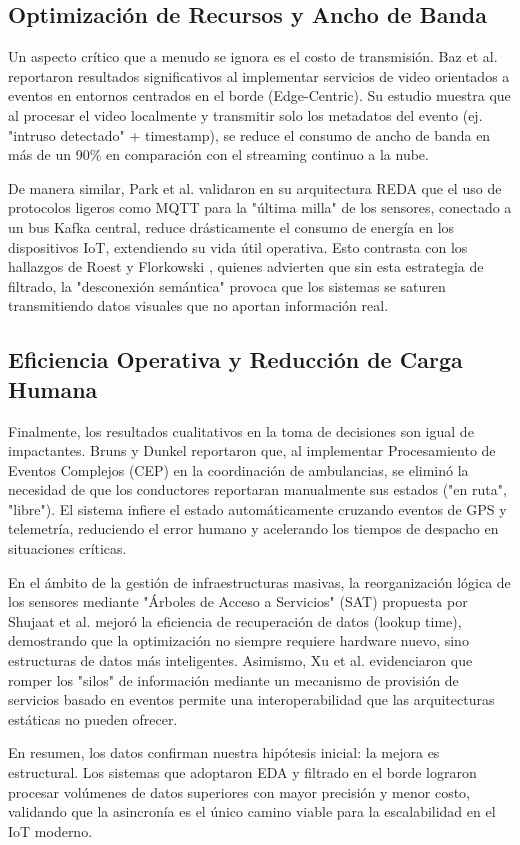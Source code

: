 

\subsection{Optimización de Recursos y Ancho de Banda}
Un aspecto crítico que a menudo se ignora es el costo de transmisión. Baz et al. \cite{baz2019video} reportaron resultados significativos al implementar servicios de video orientados a eventos en entornos centrados en el borde (Edge-Centric). Su estudio muestra que al procesar el video localmente y transmitir solo los metadatos del evento (ej. "intruso detectado" + timestamp), se reduce el consumo de ancho de banda en más de un 90\% en comparación con el streaming continuo a la nube.

De manera similar, Park et al. \cite{park2021cloud} validaron en su arquitectura REDA que el uso de protocolos ligeros como MQTT para la "última milla" de los sensores, conectado a un bus Kafka central, reduce drásticamente el consumo de energía en los dispositivos IoT, extendiendo su vida útil operativa. Esto contrasta con los hallazgos de Roest y Florkowski \cite{roest2017challenges}, quienes advierten que sin esta estrategia de filtrado, la "desconexión semántica" provoca que los sistemas se saturen transmitiendo datos visuales que no aportan información real.

\subsection{Eficiencia Operativa y Reducción de Carga Humana}
Finalmente, los resultados cualitativos en la toma de decisiones son igual de impactantes. Bruns y Dunkel \cite{bruns2014fusion} reportaron que, al implementar Procesamiento de Eventos Complejos (CEP) en la coordinación de ambulancias, se eliminó la necesidad de que los conductores reportaran manualmente sus estados ("en ruta", "libre"). El sistema infiere el estado automáticamente cruzando eventos de GPS y telemetría, reduciendo el error humano y acelerando los tiempos de despacho en situaciones críticas.

En el ámbito de la gestión de infraestructuras masivas, la reorganización lógica de los sensores mediante "Árboles de Acceso a Servicios" (SAT) propuesta por Shujaat et al. \cite{shujaat2021improvements} mejoró la eficiencia de recuperación de datos (lookup time), demostrando que la optimización no siempre requiere hardware nuevo, sino estructuras de datos más inteligentes. Asimismo, Xu et al. \cite{xu2016provisioning} evidenciaron que romper los "silos" de información mediante un mecanismo de provisión de servicios basado en eventos permite una interoperabilidad que las arquitecturas estáticas no pueden ofrecer.

En resumen, los datos confirman nuestra hipótesis inicial: la mejora es estructural. Los sistemas que adoptaron EDA y filtrado en el borde \cite{salamon2018gateway} lograron procesar volúmenes de datos superiores con mayor precisión y menor costo, validando que la asincronía es el único camino viable para la escalabilidad en el IoT moderno.